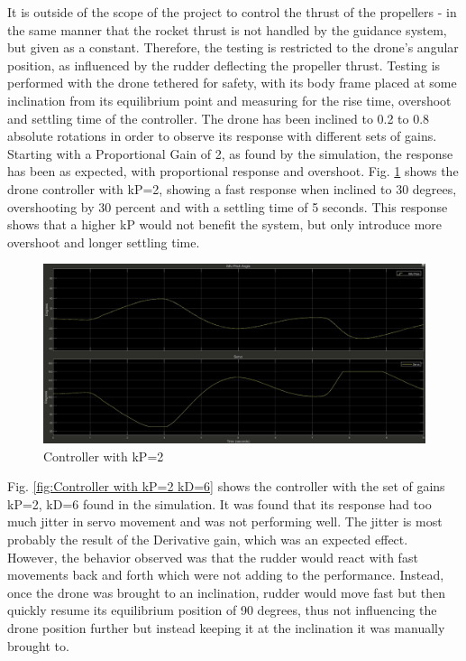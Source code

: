 It is outside of the scope of the project to control the thrust of the propellers - in the same manner that the rocket thrust is not handled by the guidance system, but given as a constant. 
Therefore, the testing is restricted to the drone's angular position, as influenced by the rudder deflecting the propeller thrust. Testing is performed with the drone tethered for safety, with its body frame placed at some inclination from its equilibrium point and measuring for the rise time, overshoot and settling time of the controller. 
The drone has been inclined to 0.2 to 0.8 absolute rotations in order to observe its response with different sets of gains.
Starting with a Proportional Gain of 2, as found by the simulation, the response has been as expected, with proportional response and overshoot.
Fig. \ref{fig:Controller with kP=2} shows the drone controller with kP=2, showing a fast response when inclined to 30 degrees, overshooting by 30 percent and with a settling time of 5 seconds. This response shows that a higher kP would not benefit the system, but only introduce more overshoot and longer settling time. 


\begin{figure}[H]
    \centering
    \includegraphics[scale=0.25]{graphics/Control/p2_Moment(2).jpg}
    \caption{Controller with kP=2}
     \label{fig:Controller with kP=2}
\end{figure} 

 Fig. \ref{fig:Controller with kP=2 kD=6} shows the controller with the set of gains kP=2, kD=6 found in the simulation. It was found that its response had too much jitter in servo movement and was not performing well. The jitter is most probably the result of the Derivative gain, which was an expected effect. However, the behavior observed was that the rudder would react with fast movements back and forth which were not adding to the performance. Instead, once the drone was brought to an inclination, rudder would move fast but then quickly resume its equilibrium position of 90 degrees, thus not influencing the drone position further but instead keeping it at the inclination it was manually brought to. 


